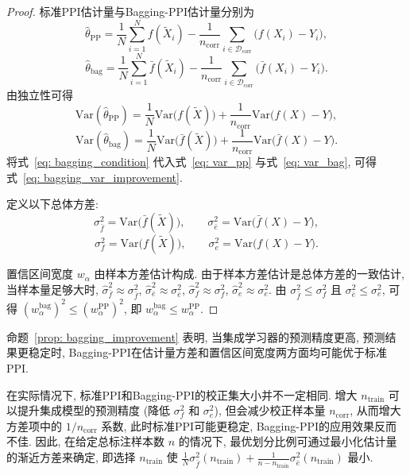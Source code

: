 \documentclass[a4paper, AutoFakeBold, UTF8]{ctexrep}
\theoremstyle{plain}
\numberwithin{equation}{chapter}
\begin{document}
\begin{proof}
标准PPI估计量与Bagging-PPI估计量分别为
\[
\hat{\theta}_{\mathrm{PP}}
=
\frac{1}{N}\sum_{i=1}^{N} f (\tilde X_i) 
-
\frac{1}{n_{\mathrm{corr}}}\sum_{i \in \mathcal{D}_{\text{corr}}}\bigl (f (X_i) -Y_i\bigr), 
\]
\[
\hat{\theta}_{\mathrm{bag}}
=
\frac{1}{N}\sum_{i=1}^{N} \bar f (\tilde X_i) 
-
\frac{1}{n_{\mathrm{corr}}}\sum_{i \in \mathcal{D}_{\text{corr}}}\bigl (\bar f (X_i) -Y_i\bigr) .
\]
由独立性可得
\begin{equation}
\mathrm{Var} (\hat{\theta}_{\mathrm{PP}}) 
=
\frac{1}{N}\mathrm{Var}\bigl (f (\tilde X) \bigr) 
+
\frac{1}{n_{\mathrm{corr}}}\mathrm{Var}\bigl (f (X) -Y\bigr), 
\label{eq: var_pp}
\end{equation}
\begin{equation}
\mathrm{Var} (\hat{\theta}_{\mathrm{bag}}) 
=
\frac{1}{N}\mathrm{Var}\bigl (\bar f (\tilde X) \bigr) 
+
\frac{1}{n_{\mathrm{corr}}}\mathrm{Var}\bigl (\bar f (X) -Y\bigr) .
\label{eq: var_bag}
\end{equation}
将式~\eqref{eq: bagging_condition} 代入式~\eqref{eq: var_pp} 与式~\eqref{eq: var_bag}, 可得式~\eqref{eq: bagging_var_improvement}. 

定义以下总体方差: 
\[
\sigma_{\bar f}^{2}=\mathrm{Var}\bigl (\bar f (\tilde X) \bigr), \qquad
\sigma_{\bar e}^{2}=\mathrm{Var}\bigl (\bar f (X) -Y\bigr), 
\]
\[
\sigma_f^{2}=\mathrm{Var}\bigl (f (\tilde X) \bigr), \qquad
\sigma_e^{2}=\mathrm{Var}\bigl (f (X) -Y\bigr) .
\]

置信区间宽度 $w_{\alpha}$ 由样本方差估计构成. 由于样本方差估计是总体方差的一致估计, 当样本量足够大时, $\hat{\sigma}_{\bar{f}}^{2} \approx \sigma_{\bar{f}}^2$, $\hat{\sigma}_{\bar{e}}^{2} \approx \sigma_{\bar{e}}^2$, $\hat{\sigma}_{f}^{2} \approx \sigma_f^2$, $\hat{\sigma}_{e}^{2} \approx \sigma_e^2$. 由 $\sigma_{\bar{f}}^2 \le \sigma_f^2$ 且 $\sigma_{\bar{e}}^2 \le \sigma_e^2$, 可得 $ (w_{\alpha}^{\text{bag}}) ^2 \le  (w_{\alpha}^{\mathrm{PP}}) ^2$, 即 $w_{\alpha}^{\text{bag}} \le w_{\alpha}^{\mathrm{PP}}$. 
\end{proof}

命题~\ref{prop: bagging_improvement} 表明, 当集成学习器的预测精度更高, 预测结果更稳定时, Bagging-PPI在估计量方差和置信区间宽度两方面均可能优于标准PPI. 

在实际情况下, 标准PPI和Bagging-PPI的校正集大小并不一定相同. 增大 $n_{\text{train}}$ 可以提升集成模型的预测精度 (降低 $\sigma_f^2$ 和 $\sigma_e^2$), 但会减少校正样本量 $n_{\text{corr}}$, 从而增大方差项中的 $1/n_{\text{corr}}$ 系数, 此时标准PPI可能更稳定, Bagging-PPI的应用效果反而不佳. 因此, 在给定总标注样本数 $n$ 的情况下, 最优划分比例可通过最小化估计量的渐近方差来确定, 即选择 $n_{\text{train}}$ 使 $\frac{1}{N}\sigma_{\bar{f}}^2 (n_{\text{train}})  + \frac{1}{n-n_{\text{train}}}\sigma_{\bar{e}}^2 (n_{\text{train}}) $ 最小. 
\end{document}
